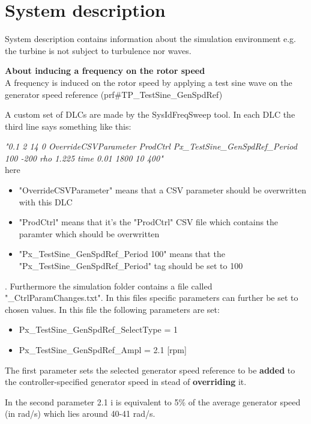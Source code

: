 \section{System description} \label{sec:sys-descr}
System description contains information about the simulation environment e.g. the turbine is not subject to turbulence nor waves.


\noindent \textbf{About inducing a frequency on the rotor speed}\\
A frequency is induced on the rotor speed by applying a test sine wave on the generator speed reference  (prf\#TP\_TestSine\_GenSpdRef)

A custom set of DLCs are made by the SysIdFreqSweep tool. In each DLC the third line says something like this:

\textit{"0.1 2 14 0 OverrideCSVParameter ProdCtrl Px\_TestSine\_GenSpdRef\_Period 100 -200 rho 1.225 time 0.01 1800 10 400"} \\
here 
\begin{itemize}
	\item "OverrideCSVParameter" means that a CSV parameter should be overwritten with this DLC
	\item "ProdCtrl" means that it's the "ProdCtrl" CSV file which contains the paramter which should be overwritten
	\item "Px\_TestSine\_GenSpdRef\_Period 100" means that the "Px\_TestSine\_GenSpdRef\_Period" tag should be set to 100
\end{itemize}. 
Furthermore the simulation folder contains a file called "\_CtrlParamChanges.txt". In this files specific parameters can further be set to chosen values. In this file the following parameters are set:
\begin{itemize}
	\item Px\_TestSine\_GenSpdRef\_SelectType 	= 1
	\item Px\_TestSine\_GenSpdRef\_Ampl			= 2.1 [rpm]
\end{itemize}
The first parameter sets the selected generator speed reference to be \textbf{added} to the controller-specified generator speed in stead of \textbf{overriding} it.

In the second parameter 2.1 i is equivalent to 5\% of the average generator speed (in rad/s) which lies around 40-41 rad/s.